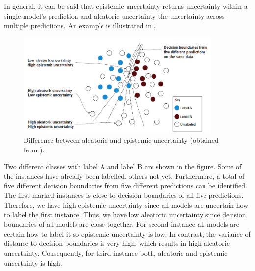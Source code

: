 In general, it can be said that epistemic uncertainty returns uncertainty within a single model's prediction and aleatoric uncertainty the uncertainty across multiple predictions.
An example is illustrated in .
\begin{figure}[t]
  \centering
    \includegraphics[width=0.90\textwidth]{figures/uncertainty_differences.PNG}
  \caption{Difference between aleatoric and epistemic uncertainty (obtained from \cite{human-in-the-loop}).}
  \label{fig:differences_aleatoric_epistemic}
\end{figure}
Two different classes with label A and label B are shown in the figure.
Some of the instances have already been labelled, others not yet.
Furthermore, a total of five different decision boundaries from five different predictions can be identified.
The first marked instances is close to decision boundaries of all five predictions.
Therefore, we have high epistemic uncertainty since all models are uncertain how to label the first instance.
Thus, we have low aleatoric uncertainty since decision boundaries of all models are close together.
For second instance all models are certain how to label it so epistemic uncertainty is low.
In contrast, the variance of distance to decision boundaries is very high, which results in high aleatoric uncertainty.
Consequently, for third instance both, aleatoric and epistemic uncertainty is high.